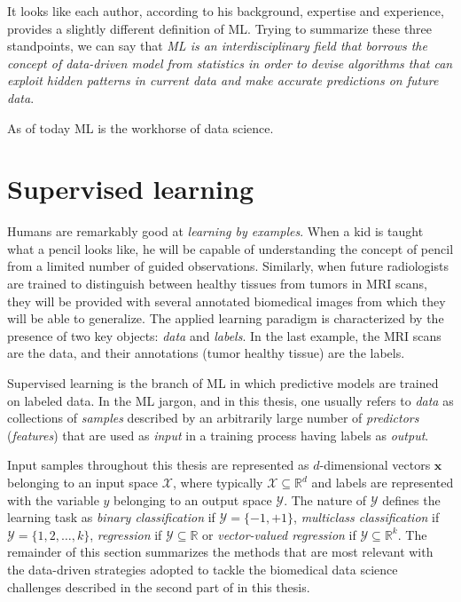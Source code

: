 It looks like each author, according to his background, expertise and experience, provides a slightly different definition of ML. Trying to summarize these three standpoints, we can say that \emph{ML is an interdisciplinary field that borrows the concept of data-driven model from statistics in order to devise algorithms that can exploit hidden patterns in current data and make accurate predictions on future data}.

As of today ML is the workhorse of data science.


  \section{Supervised learning} \label{subsec:supervised_learning}

	  Humans are remarkably good at \emph{learning by examples}. When a kid is taught what a pencil looks like, he will be capable of understanding the concept of pencil from a limited number of guided observations. Similarly, when future radiologists are trained to distinguish between healthy tissues from tumors in MRI scans, they will be provided with several annotated biomedical images from which they will be able to generalize.
	  The applied learning paradigm is characterized by the presence of two key objects: \textit{data} and \textit{labels}. In the last example, the MRI scans are the data, and their annotations (\eg tumor \vs healthy tissue) are the labels.

	  Supervised learning is the branch of ML in which predictive models are trained on labeled data. In the ML jargon, and in this thesis, one usually refers to \textit{data} as collections of \textit{samples} described by an arbitrarily large number of \textit{predictors} (\textit{features}) that are used as \textit{input} in a training process having labels as \textit{output}.

	  Input samples throughout this thesis are represented as $d$-dimensional vectors $\bm{x}$ belonging to an input space $\mathcal{X}$, where typically $\mathcal{X}\subseteq\mathbb{R}^d$ and labels are represented with the variable $y$ belonging to an output space $\mathcal{Y}$.
	  The nature of $\mathcal{Y}$ defines the learning task as \textit{binary classification} if  $\mathcal{Y} = \{-1,+1\}$, \textit{multiclass classification} if $\mathcal{Y} = \{1,2,\dots,k\}$,
	  \textit{regression} if $\mathcal{Y}\subseteq\mathds{R}$ or
	  \textit{vector-valued regression} if $\mathcal{Y}\subseteq\mathds{R}^k$.
	  The remainder of this section summarizes the methods that are most relevant with the data-driven strategies adopted to tackle the biomedical data science challenges described in the second part of in this thesis.

